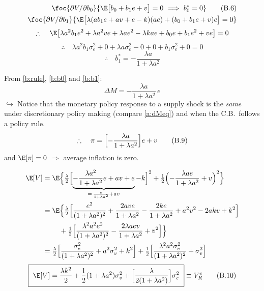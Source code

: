 \documentclass[11pt]{article}
\begin{document}
\begin{align}
  \foc{\partial V/\partial b_0}{\E\bigl[b_0+b_1e+v\bigr]=0
       \ \Longrightarrow\ b_0^*=0} \tag{B.6}\label{b:b0}\\
  \foc{\partial V/\partial b_1}{\E\bigl[\lambda(ab_1e+av+e-k)(ae)+(b_0+b_1e+v)e\bigr]=0}
       \notag
\end{align}
\[
  \therefore\quad \E\bigl[\lambda a^2b_1e^2+\lambda a^2ve+\lambda ae^2-\lambda kae
     +b_0e+b_1e^2+ve\bigr]=0
\]
\[
  \therefore\quad \lambda a^2b_1\sigma_e^2+0+\lambda a\sigma_e^2-0+0+b_1\sigma_e^2+0=0
\]
\begin{equation}
  \therefore\quad b_1^*=-\frac{\lambda a}{1+\lambda a^2} \tag{B.7}\label{b:b1}
\end{equation}

From \eqref{b:rule}, \eqref{b:b0} and \eqref{b:b1}:
\begin{equation}
  \Delta M=-\frac{\lambda a}{1+\lambda a^2}\,e \tag{B.8}\label{b:dM}
\end{equation}
$\hookrightarrow$ Notice that the monetary policy response to a supply shock is the
\emph{same} under discretionary policy making (compare \eqref{a:dMeq}) and when the C.B.\
follows a policy rule.
\begin{equation}
  \therefore\quad \pi=\Bigl[-\frac{\lambda a}{1+\lambda a^2}\Bigr]e+v \tag{B.9}\label{b:pi}
\end{equation}
and $\E[\pi]=0$ $\Rightarrow$ average inflation is zero.

\begin{align*}
  \E[V]&=\E\Bigl\{\tfrac{\lambda}{2}\Bigl[\underbrace{-\frac{\lambda a^2}{1+\lambda a^2}e
        +av+e}_{=\,\frac{e}{1+\lambda a^2}+av}-k\Bigr]^2
        +\tfrac12\Bigl(-\frac{\lambda ae}{1+\lambda a^2}+v\Bigr)^2\Bigr\}\\
  &=\E\Bigl\{\tfrac{\lambda}{2}\Bigl[\frac{e^2}{(1+\lambda a^2)^2}+\frac{2ave}{1+\lambda a^2}
        -\frac{2ke}{1+\lambda a^2}+a^2v^2-2akv+k^2\Bigr]\\
  &\qquad\ +\tfrac12\Bigl[\frac{\lambda^2a^2e^2}{(1+\lambda a^2)^2}
        -\frac{2\lambda aev}{1+\lambda a^2}+v^2\Bigr]\Bigr\}\\
  &=\tfrac{\lambda}{2}\Bigl[\frac{\sigma_e^2}{(1+\lambda a^2)^2}+a^2\sigma_v^2+k^2\Bigr]
     +\tfrac12\Bigl[\frac{\lambda^2a^2\sigma_e^2}{(1+\lambda a^2)^2}+\sigma_v^2\Bigr]
\end{align*}
\begin{equation}
  \boxed{\ \E[V]=\frac{\lambda k^2}{2}+\frac12(1+\lambda a^2)\sigma_v^2
   +\Bigl[\frac{\lambda}{2(1+\lambda a^2)}\Bigr]\sigma_e^2\ }\equiv V_R^e \tag{B.10}\label{b:VR}
\end{equation}
\end{document}
